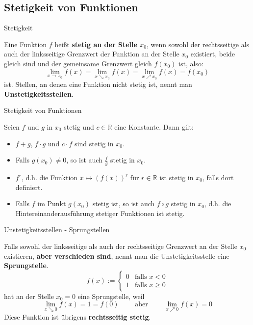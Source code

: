 \subsection{Stetigkeit von Funktionen}
\begin{frame}{Stetigkeit}
	\begin{definition}
		Eine Funktion $f$ heißt \textbf{stetig an der Stelle $x_{0}$}, wenn sowohl der rechtsseitige als auch der linksseitige Grenzwert der Funktion an der Stelle $x_{0}$ existiert, beide gleich sind und der gemeinsame Grenzwert gleich $f(x_{0})$ ist, also:
		\[
			\lim_{x \to x_{0}} f(x) = \lim_{x \searrow x_{0}} f(x) = \lim_{x \nearrow x_{0}} f(x) = f(x_{0})
		\]
		ist.
		Stellen, an denen eine Funktion nicht stetig ist, nennt man \textbf{Unstetigkeitsstellen}.
	\end{definition}
\end{frame}	
\begin{frame}{Stetigkeit von Funktionen}
	\begin{theorem}
		Seien $f$ und $g$ in $x_{0}$ stetig und $c \in \mathbb{R}$ eine Konstante. Dann gilt:
		\begin{itemize}
			\item $f + g$, $f \cdot g$ und $c \cdot f$ sind stetig in $x_{0}$.
			\item Falls $g(x_{0}) \neq 0$, so ist auch $\frac{f}{g}$ stetig in $x_{0}$.
			\item $f^{r}$, d.h. die Funktion $x \mapsto \left( f(x) \right)^{r}$ für $r \in \mathbb{R}$ ist stetig in $x_{0}$, falls dort definiert.
			\item Falls $f$ im Punkt $g(x_{0})$ stetig ist, so ist auch $f \circ g$ stetig in $x_{0}$, d.h. die Hintereinanderausführung stetiger Funktionen ist stetig.
		\end{itemize}
	\end{theorem}
\end{frame}

\begin{frame}{Unstetigkeitsstellen - Sprungstellen}
		\begin{example}
			Falls sowohl der linksseitige als auch der rechtsseitige Grenzwert an der Stelle $x_{0}$ existieren, \textbf{aber verschieden sind}, nennt man die Unstetigkeitsstelle eine \textbf{Sprungstelle}.
			\[
			f(x) := \begin{cases}
			0 & \text{falls } x<0 \\
			1 & \text{falls } x\geq 0
			\end{cases}
			\] 
			hat an der Stelle $x_{0}=0$ eine Sprungstelle, weil
			\[
			\lim_{x \searrow 0} f(x) = 1 = f(0) \qquad\text{ aber }\qquad \lim_{x \nearrow 0} f(x) = 0 
			\] 
			Diese Funktion ist übrigens \textbf{rechtsseitig stetig}.
		\end{example}
\end{frame}

